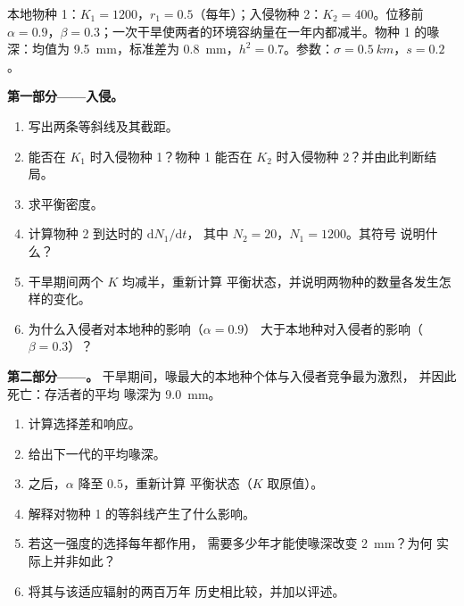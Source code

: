 \begin{problem}
\label{pb:b2:speciation:1}
本地物种 1：$K_1 = 1200$，$r_1 = 0.5$（每年）；入侵物种
2：$K_2 = 400$。位移前 $\alpha = 0.9$，$\beta =
0.3$；一次干旱使两者的环境容纳量在一年内都减半。物种 1 的喙
深：均值为 \qty{9.5}{mm}，标准差为
\qty{0.8}{mm}，$h^{2} = 0.7$。参数：$\sigma =
\qty{0.5}{km}$，$s = 0.2$。

\medskip
\noindent\textbf{第一部分——入侵。}
\begin{enumerate}
  \item 写出两条等斜线及其截距。
  \item 能否在 $K_1$ 时入侵物种 1？物种 1
        能否在 $K_2$ 时入侵物种 2？并由此判断结局。
  \item 求平衡密度。
  \item 计算物种 2 到达时的 $\mathrm{d}N_1/\mathrm{d}t$，
        其中 $N_2 = 20$，$N_1 = 1200$。其符号
        说明什么？
  \item 干旱期间两个 $K$ 均减半，重新计算
        平衡状态，并说明两物种的数量各发生怎样的变化。
  \item 为什么入侵者对本地种的影响（$\alpha = 0.9$）
        大于本地种对入侵者的影响（$\beta = 0.3$）？
\end{enumerate}

\medskip
\noindent\textbf{第二部分——。}
干旱期间，喙最大的本地种个体与入侵者竞争最为激烈，
并因此死亡：存活者的平均
喙深为 \qty{9.0}{mm}。
\begin{enumerate}[resume]
  \item 计算选择差和响应。
  \item 给出下一代的平均喙深。
  \item {}之后，$\alpha$ 降至 $0.5$，重新计算
        平衡状态（$K$ 取原值）。
  \item 解释对物种 1 的等斜线产生了什么影响。
  \item 若这一强度的选择每年都作用，
        需要多少年才能使喙深改变 \qty{2}{mm}？为何
        实际上并非如此？
  \item 将其与该适应辐射的两百万年
        历史相比较，并加以评述。
\end{enumerate}


\end{problem}

